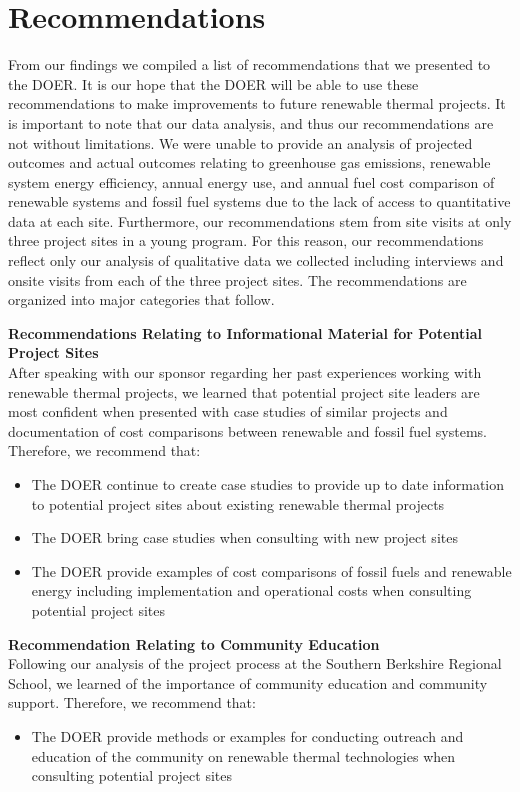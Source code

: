 \section*{Recommendations}
\par From our findings we compiled a list of recommendations that we presented to the DOER. It is our hope that the DOER will be able to use these recommendations to make improvements to future renewable thermal projects. It is important to note that our data analysis, and thus our recommendations are not without limitations. We were unable to provide an analysis of projected outcomes and actual outcomes relating to greenhouse gas emissions, renewable system energy efficiency, annual energy use, and annual fuel cost comparison of renewable systems and fossil fuel systems due to the lack of access to quantitative data at each site. Furthermore, our recommendations stem from site visits at only three project sites in a young program. For this reason, our recommendations reflect only our analysis of qualitative data we collected including interviews and onsite visits from each of the three project sites. The recommendations are organized into major categories that follow.


\noindent
\textbf{Recommendations Relating to Informational Material for Potential Project Sites}\\
\indent After speaking with our sponsor regarding her past experiences working with renewable thermal projects, we learned that potential project site leaders are most confident when presented with case studies of similar projects and documentation of cost comparisons between renewable and fossil fuel systems. Therefore, we recommend that:
\begin{itemize}
  \item{The DOER continue to create case studies to provide up to date information to potential project sites about existing renewable thermal projects}
  \item{The DOER bring case studies when consulting with new project sites}
  \item{The DOER provide examples of cost comparisons of fossil fuels and renewable energy including implementation and operational costs when consulting potential project sites}
\end{itemize}

\noindent
\textbf{Recommendation Relating to Community Education}\\
\indent Following our analysis of the project process at the Southern Berkshire Regional School, we learned of the importance of community education and community support. Therefore, we recommend that:
\begin{itemize}
  \item{The DOER provide methods or examples for conducting outreach and education of the community on renewable thermal technologies when consulting potential project sites}
\end{itemize}

